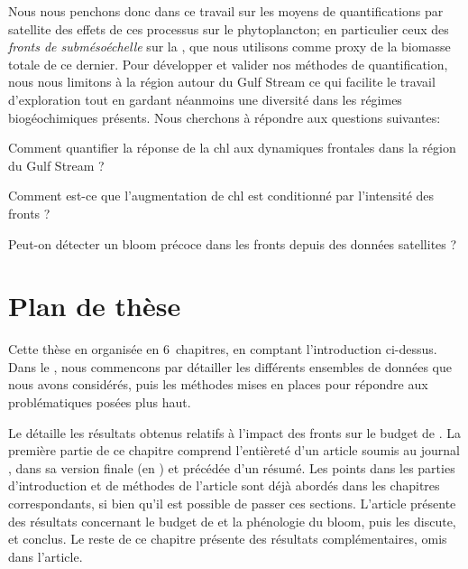 Nous nous penchons donc dans ce travail sur les moyens de quantifications par satellite des effets de ces processus sur le phytoplancton; en particulier ceux des \emph{fronts de submésoéchelle} sur la \emph{}, que nous utilisons comme proxy de la biomasse totale de ce dernier.
Pour développer et valider nos méthodes de quantification, nous nous limitons à la région autour du Gulf Stream ce qui facilite le travail d'exploration tout en gardant néanmoins une diversité dans les régimes biogéochimiques présents.
Nous cherchons à répondre aux questions suivantes:

\begin{tcolorbox}[
  enhanced,
  frame hidden, interior hidden,
  borderline={1.pt}{3pt}{black}, arc=2.mm,
  borderline north={1.2pt}{0pt}{black},
  borderline south={1.2pt}{0pt}{black},
  borderline west={1.2pt}{0pt}{black},
  borderline east={1.2pt}{0pt}{black},
  top=2\onelineskip,
  bottom=2\onelineskip,
  ]
  \begin{list}{}{
      \setlength{\labelsep}{0.5em}
      \setlength{\itemindent}{0pt}
      \setlength{\leftmargin}{2em}
      \setlength{\labelwidth}{0.5em}
      \setlength{\listparindent}{0pt}
      \setlength{\parsep}{\parskip}
      \setlength{\itemsep}{\onelineskip}
      \setlength{\topsep}{\onelineskip}
      \renewcommand*\makelabel[1]{\adfrightarrowhead}}
    \item Comment quantifier la réponse de la chl aux dynamiques frontales dans la région du Gulf Stream ?
    \item Comment est-ce que l'augmentation de chl est conditionné par l'intensité des fronts ?
    \item Peut-on détecter un bloom précoce dans les fronts depuis des données satellites ?
  \end{list}
\end{tcolorbox}

\section{Plan de thèse}
\label{sec:plan-de-these}

Cette thèse en organisée en 6~chapitres, en comptant l'introduction ci-dessus.
Dans le , nous commencons par détailler les différents ensembles de données que nous avons considérés, puis les méthodes mises en places pour répondre aux problématiques posées plus haut.

Le  détaille les résultats obtenus relatifs à l'impact des fronts sur le budget de .
La première partie de ce chapitre comprend l'entièreté d'un article soumis au journal , dans sa version finale (en ) et précédée d'un résumé.
Les points dans les parties d'introduction et de méthodes de l'article sont déjà abordés dans les chapitres correspondants, si bien qu'il est possible de passer ces sections.
L'article présente des résultats concernant le budget de  et la phénologie du bloom, puis les discute, et conclus.
Le reste de ce chapitre présente des résultats complémentaires, omis dans l'article.

